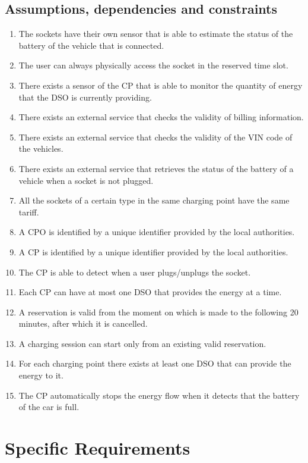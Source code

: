 \documentclass{Configuration_Files/PoliMi3i_thesis}
\begin{document}
\section{Assumptions, dependencies and constraints}

\begin{enumerate}[label=\textbf{D\arabic*}]
    \item The sockets have their own sensor that is able to estimate the status of the battery of the vehicle that is connected.
    \item The user can always physically access the socket in the reserved time slot.
    \item There exists a sensor of the CP that is able to monitor the quantity of energy that the DSO is currently providing.
    \item There exists an external service that checks the validity of billing information.
    \item There exists an external service that checks the validity of the VIN code of the vehicles.
    \item There exists an external service that retrieves the status of the battery of a vehicle when a socket is not plugged.
    \item All the sockets of a certain type in the same charging point have the same tariff.
    \item A CPO is identified by a unique identifier provided by the local authorities.
    \item A CP is identified by a unique identifier provided by the local authorities.
    \item The CP is able to detect when a user plugs/unplugs the socket.
    \item Each CP can have at most one DSO that provides the energy at a time.
    \item A reservation is valid from the moment on which is made to the following 20 minutes, after which it is cancelled.
    \item A charging session can start only from an existing valid reservation.
    \item For each charging point there exists at least one DSO that can provide the energy to it.
    \item The CP automatically stops the energy flow when it detects that the battery of the car is full.
\end{enumerate}

\chapter{Specific Requirements}
\end{document}
